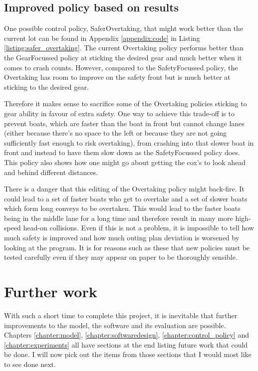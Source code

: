   \subsection{Improved policy based on results}
  One possible control policy, SaferOvertaking, that might work better than the current lot can be found in Appendix \ref{appendix:code} in Listing \ref{listing:safer_overtaking}. The current Overtaking policy performs better than the GearFocussed policy at sticking the desired gear and much better when it comes to crash counts. However, compared to the SafetyFocussed policy, the Overtaking has room to improve on the safety front but is much better at sticking to the desired gear. 
  
  Therefore it makes sense to sacrifice some of the Overtaking policies sticking to gear ability in favour of extra safety. One way to achieve this trade-off is to prevent boats, which are faster than the boat in front but cannot change lanes (either because there's no space to the left or because they are not going sufficiently fast enough to risk overtaking), from crashing into that slower boat in front and instead to have them slow down as the SafetyFocussed policy does. This policy also shows how one might go about getting the cox's to look ahead and behind different distances. 
  
  There is a danger that this editing of the Overtaking policy might back-fire. It could lead to a set of faster boats who get to overtake and a set of slower boats which form long conveys to be overtaken. This would lead to the faster boats being in the middle lane for a long time and therefore result in many more high-speed head-on collisions. Even if this is not a problem, it is impossible to tell how much safety is improved and how much outing plan deviation is worsened by looking at the program. It is for reasons such as these that new policies must be tested carefully even if they may appear on paper to be thoroughly sensible.
  
  \section{Further work}
  With such a short time to complete this project, it is inevitable that further improvements to the model, the software and its evaluation are possible. Chapters \ref{chapter:model}, \ref{chapter:softwaredesign}, \ref{chapter:control_policy} and \ref{chapter:experiments} all have sections at the end listing future work that could be done. I will now pick out the items from those sections that I would most like to see done next.
  
